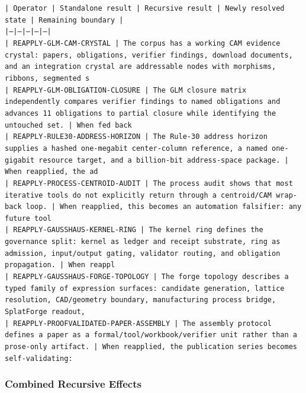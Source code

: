 \documentclass[11pt]{article}
\begin{document}
\noindent\texttt{| Operator | Standalone result | Recursive result | Newly resolved state | Remaining boundary |}\\
\noindent\texttt{|---|---|---|---|---|}\\
\noindent\texttt{| REAPPLY-GLM-CAM-CRYSTAL | The corpus has a working CAM evidence crystal: papers, obligations, verifier findings, download documents, and an integration crystal are addressable nodes with morphisms, ribbons, segmented s}\\
\noindent\texttt{| REAPPLY-GLM-OBLIGATION-CLOSURE | The GLM closure matrix independently compares verifier findings to named obligations and advances 11 obligations to partial closure while identifying the untouched set. | When fed back }\\
\noindent\texttt{| REAPPLY-RULE30-ADDRESS-HORIZON | The Rule-30 address horizon supplies a hashed one-megabit center-column reference, a named one-gigabit resource target, and a billion-bit address-space package. | When reapplied, the ad}\\
\noindent\texttt{| REAPPLY-PROCESS-CENTROID-AUDIT | The process audit shows that most iterative tools do not explicitly return through a centroid/CAM wrap-back loop. | When reapplied, this becomes an automation falsifier: any future tool}\\
\noindent\texttt{| REAPPLY-GAUSSHAUS-KERNEL-RING | The kernel ring defines the governance split: kernel as ledger and receipt substrate, ring as admission, input/output gating, validator routing, and obligation propagation. | When reappl}\\
\noindent\texttt{| REAPPLY-GAUSSHAUS-FORGE-TOPOLOGY | The forge topology describes a typed family of expression surfaces: candidate generation, lattice resolution, CAD/geometry boundary, manufacturing process bridge, SplatForge readout, }\\
\noindent\texttt{| REAPPLY-PROOFVALIDATED-PAPER-ASSEMBLY | The assembly protocol defines a paper as a formal/tool/workbook/verifier unit rather than a prose-only artifact. | When reapplied, the publication series becomes self-validating:}\\

\subsubsection*{Combined Recursive Effects}
\end{document}
